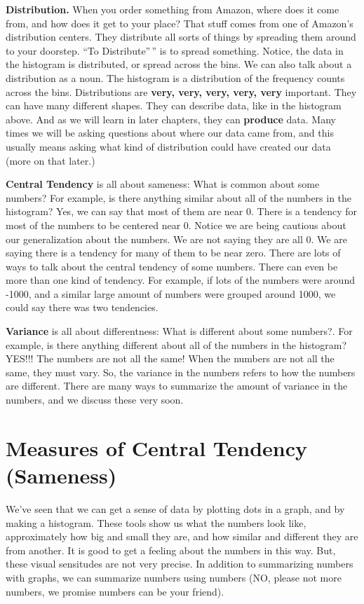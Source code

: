 \documentclass[
]{book}
\begin{document}
\textbf{Distribution.} When you order something from Amazon, where does it come from, and how does it get to your place? That stuff comes from one of Amazon's distribution centers. They distribute all sorts of things by spreading them around to your doorstep. ``To Distribute''\,'' is to spread something. Notice, the data in the histogram is distributed, or spread across the bins. We can also talk about a distribution as a noun. The histogram is a distribution of the frequency counts across the bins. Distributions are \textbf{very, very, very, very, very} important. They can have many different shapes. They can describe data, like in the histogram above. And as we will learn in later chapters, they can \textbf{produce} data. Many times we will be asking questions about where our data came from, and this usually means asking what kind of distribution could have created our data (more on that later.)

\textbf{Central Tendency} is all about sameness: What is common about some numbers? For example, is there anything similar about all of the numbers in the histogram? Yes, we can say that most of them are near 0. There is a tendency for most of the numbers to be centered near 0. Notice we are being cautious about our generalization about the numbers. We are not saying they are all 0. We are saying there is a tendency for many of them to be near zero. There are lots of ways to talk about the central tendency of some numbers. There can even be more than one kind of tendency. For example, if lots of the numbers were around -1000, and a similar large amount of numbers were grouped around 1000, we could say there was two tendencies.

\textbf{Variance} is all about differentness: What is different about some numbers?. For example, is there anything different about all of the numbers in the histogram? YES!!! The numbers are not all the same! When the numbers are not all the same, they must vary. So, the variance in the numbers refers to how the numbers are different. There are many ways to summarize the amount of variance in the numbers, and we discuss these very soon.

\section{Measures of Central Tendency (Sameness)}\label{measures-of-central-tendency-sameness}

We've seen that we can get a sense of data by plotting dots in a graph, and by making a histogram. These tools show us what the numbers look like, approximately how big and small they are, and how similar and different they are from another. It is good to get a feeling about the numbers in this way. But, these visual sensitudes are not very precise. In addition to summarizing numbers with graphs, we can summarize numbers using numbers (NO, please not more numbers, we promise numbers can be your friend).
\end{document}
